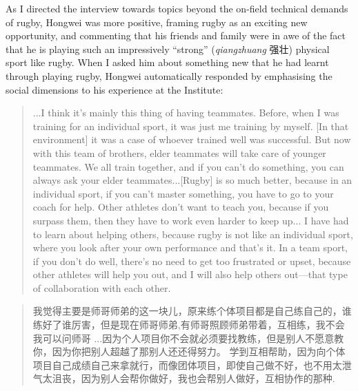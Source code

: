 \begin{CJK}{UTF8}{gbsn}
As I directed the interview towards topics beyond the on-field technical demands of rugby, Hongwei was more positive, framing rugby as an exciting new opportunity, and commenting that his friends and family were in awe of the fact that he is playing such an impressively ``strong'' (\textit{qiangzhuang} 强壮) physical sport like rugby.  When I asked him about something new that he had learnt through playing rugby, Hongwei automatically responded by emphasising the social dimensions to his experience at the Institute:

  \begin{quote}
    ...I think it's mainly this thing of having teammates. Before, when I was training for an individual sport, it was just me training by myself. [In that environment] it was a case of whoever trained well was successful.  But now with this team of brothers, elder teammates will take care of younger teammates. We all train together, and if you can't do something, you can always ask your elder teammates...[Rugby] is so much better, because in an individual sport, if you can't master something, you have to go to your coach for help. Other athletes don't want to teach you, because if you surpass them, then they have to work even harder to keep up... I have had to learn about helping others, because rugby is not like an individual sport, where you look after your own performance and that's it.  In a team sport, if you don't do well, there's no need to get too frustrated or upset, because other athletes will help you out, and I will also help others out---that type of collaboration with each other.
  \end{quote}

\begin{CJK}{UTF8}{gbsn}
  \begin{quote}
    我觉得主要是师哥师弟的这一块儿，原来练个体项目都是自己练自己的，谁练好了谁厉害，但是现在师哥师弟,有师哥照顾师弟带着，互相练，我不会我可以问师哥
    ...因为个人项目你不会就必须要找教练，但是别人不愿意教你，因为你把别人超越了那别人还还得努力。 学到互相帮助，因为向个体项目自己成绩自己来拿就行，而像团体项目，即使自己做不好，也不用太泄气太沮丧，因为别人会帮你做好，我也会帮别人做好，互相协作的那种.
  \end{quote}
\end{CJK}


\end{CJK}
